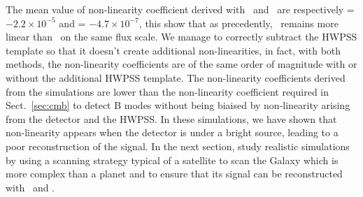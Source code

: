 The mean value of non-linearity coefficient derived with \methodu\ and \methodd\ are respectively \epsDET = $-2.2 \times 10^{-5}$ and \epsDET =  $-4.7 \times 10^{-7}$, this show that as precedently, \methodd\ remains more linear than \methodu\ on the same flux scale. We manage to correctly subtract the HWPSS template so that it doesn't create additional non-linearities, in fact, with both methods, the non-linearity coefficients are of the same order of magnitude with or without the additional HWPSS template. The non-linearity coefficients derived from the simulations are lower than the non-linearity coefficient required in Sect.~\ref{sec:cmb} to detect B modes without being biaised by non-linearity arising from the detector and the HWPSS. 
In these simulations, we have shown that non-linearity appears when the detector is under a bright source, leading to a poor reconstruction of the signal. In the next section, study realistic simulations by using a scanning strategy typical of a satellite to scan the Galaxy which is more complex than a planet and to ensure that its signal can be reconstructed with \methodu\ and \methodd .
